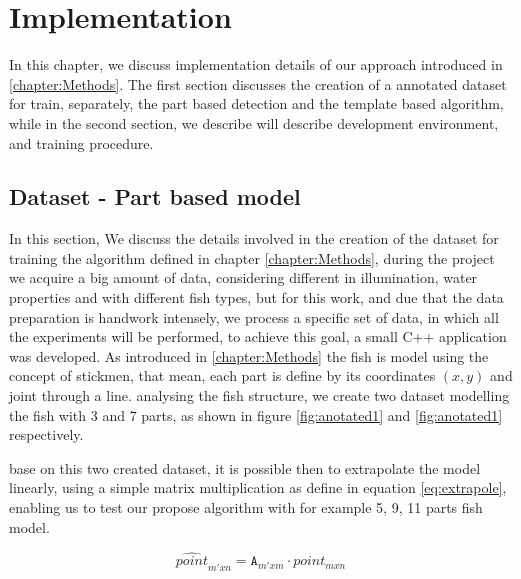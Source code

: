 \chapter{Implementation}
\label{chapter:Implementation}

In this chapter, we discuss implementation details of our approach introduced in 
\ref{chapter:Methods}. The first section discusses the creation of a annotated dataset 
for train, separately, the part based detection and the template based algorithm, while 
in the second section, we describe will describe development environment, and  training procedure.

\section{Dataset - Part based model}
In this section, We discuss the details involved in the creation of the dataset for
training the algorithm defined in chapter \ref{chapter:Methods}, during the project we acquire
a big amount of data, considering different in illumination, water properties and
with different fish types, but for this work, and due that the data preparation is 
handwork intensely, we process a specific set of data, in which all the experiments
will be performed, to achieve this goal, a small C++ application was developed.
As introduced in \ref{chapter:Methods} the fish is model using the concept of stickmen, that
mean, each part is define by its coordinates $(x,y)$ and joint through a line.
analysing the fish structure, we create two dataset modelling the fish with 3 and 7 parts, as shown in
figure \ref{fig:anotated1} and \ref{fig:anotated1} respectively.

base on this two created dataset, it is possible then to extrapolate the model linearly,
using a simple matrix multiplication as define in equation \ref{eq:extrapole}, enabling us to 
test our propose algorithm with for example 5, 9, 11 parts fish model.


\begin{equation}
 \label{eq:extrapole}
\hat{point}_{m'xn} =\mathtt{A}_{m'xm} \cdot point_{mxn}
\end{equation}

